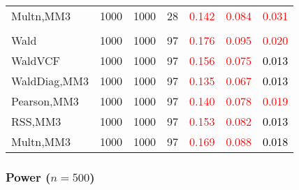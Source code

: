\documentclass[
]{article}
\begin{document}
\begin{table}[H]
{\begin{tabular}[t]{lrrrrrr}
\hspace{1em}Multn,MM3 & 1000 & 1000 & 28 & \textcolor{red}{0.142} & \textcolor{red}{0.084} & \textcolor{red}{0.031}\\
\addlinespace[0.3em]
\multicolumn{7}{l}{\textbf{3F 15V}}\\
\hspace{1em}Wald & 1000 & 1000 & 97 & \textcolor{red}{0.176} & \textcolor{red}{0.095} & \textcolor{red}{0.020}\\
\hspace{1em}WaldVCF & 1000 & 1000 & 97 & \textcolor{red}{0.156} & \textcolor{red}{0.075} & \textcolor{black}{0.013}\\
\hspace{1em}WaldDiag,MM3 & 1000 & 1000 & 97 & \textcolor{red}{0.135} & \textcolor{red}{0.067} & \textcolor{black}{0.013}\\
\hspace{1em}Pearson,MM3 & 1000 & 1000 & 97 & \textcolor{red}{0.140} & \textcolor{red}{0.078} & \textcolor{red}{0.019}\\
\hspace{1em}RSS,MM3 & 1000 & 1000 & 97 & \textcolor{red}{0.153} & \textcolor{red}{0.082} & \textcolor{black}{0.013}\\
\hspace{1em}Multn,MM3 & 1000 & 1000 & 97 & \textcolor{red}{0.169} & \textcolor{red}{0.088} & \textcolor{black}{0.018}\\
\bottomrule
\end{tabular}}
\endgroup{}
\end{table}

\hypertarget{power-n500-3}{%
\subsubsection{\texorpdfstring{Power
(\(n=500\))}{Power (n=500)}}\label{power-n500-3}}
\end{document}
